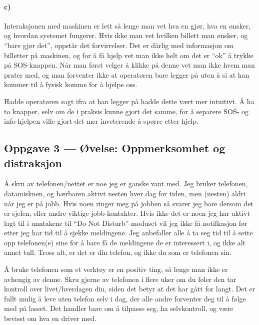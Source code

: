 \documentclass{../../myassignment}
\begin{document}
	\paragraph*{c)}  %

	Interaksjonen med maskinen er lett s{\aa} lenge man vet hva en gj{\o}r, hva en {\o}nsker, og hvordan systemet fungerer. Hvis ikke man vet hvilken billett man {\o}nsker, og ``bare gj{\o}r det'', oppst{\aa}r det forvirrelser. Det er d{\aa}rlig med informasjon om billetter p{\aa} maskinen, og for {\aa} f{\aa} hjelp vet man ikke helt om det er ``ok'' {\aa} trykke p{\aa} SOS-knappen. N{\aa}r man f{\o}rst velger {\aa} klikke p{\aa} denne vet man ikke hvem man prater med, og man forventer ikke at operat{\o}ren bare legger p{\aa} uten {\aa} si at han kommer til {\aa} fysisk komme for {\aa} hjelpe oss.

	Hadde operat{\o}ren sagt ifra at han legger p{\aa} hadde dette v{\ae}rt mer intuitivt. {\AA} ha to knapper, selv om de i praksis  kunne gjort det samme, for {\aa} separere SOS- og info-hjelpen ville gjort det mer inveterende {\aa} sp{\o}rre etter hjelp. 


	\subsection*{Oppgave 3 --- Øvelse: Oppmerksomhet og distraksjon}

	{\AA} skru av telefonen/nettet er noe jeg er ganske vant med. Jeg bruker telefonen, datamisknen, og b{\ae}rbaren aktivt nesten hver dag for tiden, men (nesten) aldri n{\aa}r jeg er p{\aa} jobb. Hvis noen ringer meg p{\aa} jobben s{\aa} svarer jeg bare dersom det er sjefen, eller andre viktige jobb-kontakter. Hvis ikke det er noen jeg har aktivt lagt til i unntakene til ``Do Not Disturb''-moduset vil jeg ikke f{\aa} notifkasjon f{\o}r etter jeg har tid til {\aa} sjekke meldingene. Jeg anbefaller alle {\aa} ta seg tid til {\aa} sette opp telefonen(e) sine for {\aa} bare f{\aa} de meldingene de er interessert i, og ikke alt annet tull. Tross alt, er det er din telefon, og ikke du som er telefonen sin. 

	{\AA} bruke telefonen som et verkt{\o}y er en positiv ting, s{\aa} lenge man ikke er avhengig av denne. Skru gjerne av telefonen i flere uker om du f{\o}ler den tar kontroll over livet/hverdagen din, siden det betyr at det har g{\aa}tt for langt. Det er fullt mulig {\aa} leve uten telefon selv i dag, der alle andre forventer deg til {\aa} f{\o}lge med p{\aa} lasset. Det handler bare om {\aa} tilpasse seg, ha selvkontroll, og v{\ae}re bevisst om hva en driver med. 
\end{document}
